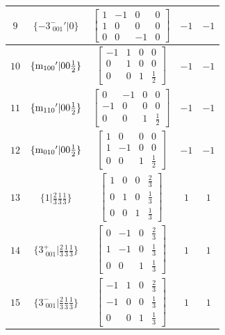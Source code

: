 \documentclass[fleqn,8pt]{jsarticle}
\begin{document}
\begin{longtable}{ccccc}
$ 9 $ & $ \{-3^{-}_{\,\,001}{}'|0\} $ & $ \begin{bmatrix} 1 & -1 & 0 & 0 \\ 1 & 0 & 0 & 0 \\ 0 & 0 & -1 & 0 \end{bmatrix} $ & $ -1 $ & $ -1 $ \\ \hline
$ 10 $ & $ \{{\rm m}_{100}{}'|0 0 \frac{1}{2}\} $ & $ \begin{bmatrix} -1 & 1 & 0 & 0 \\ 0 & 1 & 0 & 0 \\ 0 & 0 & 1 & \frac{1}{2} \end{bmatrix} $ & $ -1 $ & $ -1 $ \\ \hline
$ 11 $ & $ \{{\rm m}_{110}{}'|0 0 \frac{1}{2}\} $ & $ \begin{bmatrix} 0 & -1 & 0 & 0 \\ -1 & 0 & 0 & 0 \\ 0 & 0 & 1 & \frac{1}{2} \end{bmatrix} $ & $ -1 $ & $ -1 $ \\ \hline
$ 12 $ & $ \{{\rm m}_{010}{}'|0 0 \frac{1}{2}\} $ & $ \begin{bmatrix} 1 & 0 & 0 & 0 \\ 1 & -1 & 0 & 0 \\ 0 & 0 & 1 & \frac{1}{2} \end{bmatrix} $ & $ -1 $ & $ -1 $ \\ \hline
$ 13 $ & $ \{1|\frac{2}{3} \frac{1}{3} \frac{1}{3}\} $ & $ \begin{bmatrix} 1 & 0 & 0 & \frac{2}{3} \\ 0 & 1 & 0 & \frac{1}{3} \\ 0 & 0 & 1 & \frac{1}{3} \end{bmatrix} $ & $ 1 $ & $ 1 $ \\ \hline
$ 14 $ & $ \{3^{+}_{\,\,001}|\frac{2}{3} \frac{1}{3} \frac{1}{3}\} $ & $ \begin{bmatrix} 0 & -1 & 0 & \frac{2}{3} \\ 1 & -1 & 0 & \frac{1}{3} \\ 0 & 0 & 1 & \frac{1}{3} \end{bmatrix} $ & $ 1 $ & $ 1 $ \\ \hline
$ 15 $ & $ \{3^{-}_{\,\,001}|\frac{2}{3} \frac{1}{3} \frac{1}{3}\} $ & $ \begin{bmatrix} -1 & 1 & 0 & \frac{2}{3} \\ -1 & 0 & 0 & \frac{1}{3} \\ 0 & 0 & 1 & \frac{1}{3} \end{bmatrix} $ & $ 1 $ & $ 1 $ \\ \hline

\end{longtable}
\end{document}
